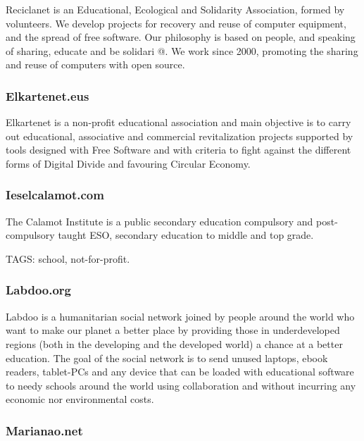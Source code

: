 \documentclass[
]{book}
\begin{document}
Reciclanet is an Educational, Ecological and Solidarity Association, formed by volunteers. We develop projects for recovery and reuse of computer equipment, and the spread of free software. Our philosophy is based on people, and speaking of sharing, educate and be solidari @. We work since 2000, promoting the sharing and reuse of computers with open source.

\hypertarget{elkartenet.eus}{%
\subsubsection{Elkartenet.eus}\label{elkartenet.eus}}

Elkartenet is a non-profit educational association and main objective is to carry out educational, associative and commercial revitalization projects supported by tools designed with Free Software and with criteria to fight against the different forms of Digital Divide and favouring Circular Economy.

\hypertarget{ieselcalamot.com}{%
\subsubsection{Ieselcalamot.com}\label{ieselcalamot.com}}

The Calamot Institute is a public secondary education compulsory and post-compulsory taught ESO, secondary education to middle and top grade.

TAGS: school, not-for-profit.

\hypertarget{labdoo.org}{%
\subsubsection{Labdoo.org}\label{labdoo.org}}

Labdoo is a humanitarian social network joined by people around the world who want to make our planet a better place by providing those in underdeveloped regions (both in the developing and the developed world) a chance at a better education. The goal of the social network is to send unused laptops, ebook readers, tablet-PCs and any device that can be loaded with educational software to needy schools around the world using collaboration and without incurring any economic nor environmental costs.

\hypertarget{marianao.net}{%
\subsubsection{Marianao.net}\label{marianao.net}}
\end{document}

